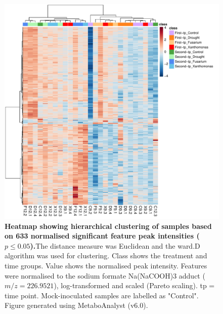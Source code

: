 \begin{figure}[hp!]
    \centering
    \includegraphics[width=\textwidth]{Figures/Sig633FeaturesRedSamplesRedGroups_ForThesis.pdf}
    \caption[Heatmap showing hierarchical clustering of samples based on 633 normalised significant feature peak intensities ($p \le0.05$).]{\textbf{Heatmap showing hierarchical clustering of samples based on 633 normalised significant feature peak intensities ($p \le0.05$).}The distance measure was Euclidean and the ward.D algorithm was used for clustering. Class shows the treatment and time groups. Value shows the normalised peak intensity. Features were normalised to the sodium formate Na(NaCOOH)3 adduct ($m/z=226.9521$), log-transformed and scaled (Pareto scaling). tp =  time point. Mock-inoculated samples are labelled as "Control". Figure generated using MetaboAnalyst (v6.0).}
    \label{fig:Sig657FeaturesRedSamples}
\end{figure}



